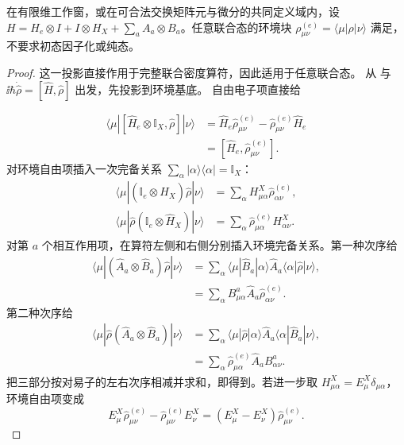 \begin{proposition}[双系统密度块的精确运动方程]
在有限维工作窗，或在可合法交换矩阵元与微分的共同定义域内，设 $H=H_e\otimes I+I\otimes H_X+\sum_a A_a\otimes B_a$。任意联合态的环境块 $\rho^{(e)}_{\mu\nu}=\langle\mu|\rho|\nu\rangle$ 满足，不要求初态因子化或纯态。
\end{proposition}
\begin{proof}
这一投影直接作用于完整联合密度算符，因此适用于任意联合态。 从 与 $\ii\hbar\dot{\hat\rho}=[\hat H,\hat\rho]$ 出发，先投影到环境基底。 自由电子项直接给

\begin{align*}
\langle\mu|[\hat H_e\otimes\mathbb I_X,\hat\rho]|\nu\rangle
&=\hat H_e\hat\rho^{(e)}_{\mu\nu}
-\hat\rho^{(e)}_{\mu\nu}\hat H_e\\
&=[\hat H_e,\hat\rho^{(e)}_{\mu\nu}].
\end{align*}
对环境自由项插入一次完备关系 $\sum_\alpha|\alpha\rangle\langle\alpha|=\mathbb I_X$：
\begin{align*}
\langle\mu|(\mathbb I_e\otimes\hat H_X)\hat\rho|\nu\rangle
&=\sum_\alpha H^X_{\mu\alpha}\hat\rho^{(e)}_{\alpha\nu},\\
\langle\mu|\hat\rho(\mathbb I_e\otimes\hat H_X)|\nu\rangle
&=\sum_\alpha\hat\rho^{(e)}_{\mu\alpha}H^X_{\alpha\nu}.
\end{align*}
对第 $a$ 个相互作用项，在算符左侧和右侧分别插入环境完备关系。第一种次序给
\begin{align*}
\langle\mu|(\hat A_a\otimes\hat B_a)\hat\rho|\nu\rangle
&=\sum_\alpha
\langle\mu|\hat B_a|\alpha\rangle
\hat A_a\langle\alpha|\hat\rho|\nu\rangle,\\
&=\sum_\alpha B^a_{\mu\alpha}\hat A_a\hat\rho^{(e)}_{\alpha\nu}.
\end{align*}
第二种次序给
\begin{align*}
\langle\mu|\hat\rho(\hat A_a\otimes\hat B_a)|\nu\rangle
&=\sum_\alpha
\langle\mu|\hat\rho|\alpha\rangle
\hat A_a\langle\alpha|\hat B_a|\nu\rangle,\\
&=\sum_\alpha\hat\rho^{(e)}_{\mu\alpha}\hat A_a B^a_{\alpha\nu}.
\end{align*}
把三部分按对易子的左右次序相减并求和，即得到。若进一步取 $H^X_{\mu\alpha}=E^X_\mu\delta_{\mu\alpha}$，环境自由项变成
\begin{equation*}
E^X_\mu\hat\rho^{(e)}_{\mu\nu}
-\hat\rho^{(e)}_{\mu\nu}E^X_\nu
=(E^X_\mu-E^X_\nu)\hat\rho^{(e)}_{\mu\nu}.
\end{equation*}
\end{proof}


